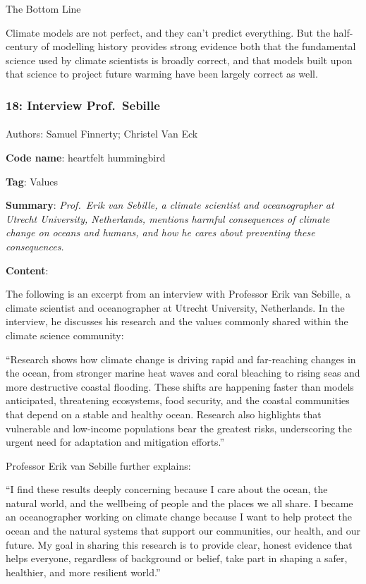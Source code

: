 \documentclass[
  letterpaper,
  DIV=11,
  numbers=noendperiod]{scrartcl}
\makeatletter
\let\oldparagraph\paragraph
\renewcommand{\paragraph}{
    \@ifstar
      \xxxParagraphStar
      \xxxParagraphNoStar
  }
\newcommand{\xxxParagraphStar}[1]{\oldparagraph*{#1}\mbox{}}
\newcommand{\xxxParagraphNoStar}[1]{\oldparagraph{#1}\mbox{}}
\makeatother
\begin{document}
The Bottom Line

Climate models are not perfect, and they can't predict everything. But
the half-century of modelling history provides strong evidence both that
the fundamental science used by climate scientists is broadly correct,
and that models built upon that science to project future warming have
been largely correct as well.

\subsubsection{18: Interview
Prof.~Sebille}\label{interview-prof.-sebille}

\paragraph{Authors: Samuel Finnerty; Christel Van
Eck}\label{authors-samuel-finnerty-christel-van-eck}

\textbf{Code name}: heartfelt hummingbird

\textbf{Tag}: Values

\textbf{Summary}: \emph{Prof.~Erik van Sebille, a climate scientist and
oceanographer at Utrecht University, Netherlands, mentions harmful
consequences of climate change on oceans and humans, and how he cares
about preventing these consequences.}

\textbf{Content}:

The following is an excerpt from an interview with Professor Erik van
Sebille, a climate scientist and oceanographer at Utrecht University,
Netherlands. In the interview, he discusses his research and the values
commonly shared within the climate science community:

``Research shows how climate change is driving rapid and far-reaching
changes in the ocean, from stronger marine heat waves and coral
bleaching to rising seas and more destructive coastal flooding. These
shifts are happening faster than models anticipated, threatening
ecosystems, food security, and the coastal communities that depend on a
stable and healthy ocean. Research also highlights that vulnerable and
low-income populations bear the greatest risks, underscoring the urgent
need for adaptation and mitigation efforts.''

Professor Erik van Sebille further explains:

``I find these results deeply concerning because I care about the ocean,
the natural world, and the wellbeing of people and the places we all
share. I became an oceanographer working on climate change because I
want to help protect the ocean and the natural systems that support our
communities, our health, and our future. My goal in sharing this
research is to provide clear, honest evidence that helps everyone,
regardless of background or belief, take part in shaping a safer,
healthier, and more resilient world.''
\end{document}
